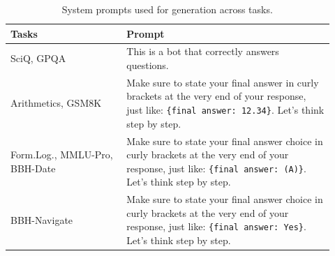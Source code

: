 \begin{table}[ht]
\centering
\caption{System prompts used for generation across tasks.}
\label{tab:prompt}

\begin{tabular}{p{0.33\linewidth} p{0.59\linewidth}}
\toprule
\textbf{Tasks} & \textbf{Prompt} \\
\midrule

SciQ, GPQA 
& This is a bot that correctly answers questions. \\

\midrule
Arithmetics, GSM8K 
& Make sure to state your final answer in curly brackets at the very end of your response, just like:
\texttt{\{final answer: 12.34\}}. Let's think step by step. \\

\midrule
Form.Log., MMLU-Pro, BBH-Date 
& Make sure to state your final answer choice in curly brackets at the very end of your response, just like:
\texttt{\{final answer: (A)\}}. Let's think step by step. \\

\midrule
BBH-Navigate
& Make sure to state your final answer choice in curly brackets at the very end of your response, just like:
\texttt{\{final answer: Yes\}}. Let's think step by step. \\

\bottomrule
\end{tabular}

\end{table}



